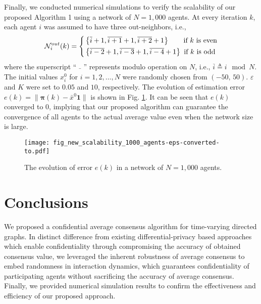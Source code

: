 \documentclass{IEEEtran}
\begin{document}
Finally, we conducted numerical simulations to verify the scalability of our proposed Algorithm 1 using a network of $N=1,000$ agents. At every iteration $k$, each agent $i$ was assumed to have three out-neighbors, i.e.,
\begin{equation}
	\mathcal{N}_i^{out}(k)=\left\{
	\begin{aligned}
		& \left\{\overline{i}+1,\overline{i+1}+1,\overline{i+2}+1\right\} \qquad \textnormal{if} \ k \ \textnormal{is even}\\
		& \left\{\overline{i-2}+1, \overline{i-3}+1,\overline{i-4}+1\right\} \ \textnormal{if} \ k \ \textnormal{is odd}\\
	\end{aligned}\right.
\end{equation}
where the superscript ``$\bar{\quad}$'' represents modulo operation on $N$, i.e., $\overline{i} \triangleq i \mod N$. The initial values $x_i^0$ for $i=1,2,\ldots,N$ were randomly chosen from $(-50,\, 50)$. $\varepsilon$ and $K$ were set to $0.05$ and $10$, respectively. The evolution of estimation error $e(k)=\|\boldsymbol{\pi}(k)-\bar{x}^0 \mathbf{1}\|$ is shown in Fig. \ref{fig_evolution_1000_agents}. It can be seen that $e(k)$ converged to $0$, implying that our proposed algorithm can guarantee the convergence of all agents to the actual average value even when the network size is large.

\begin{figure}[!h]
	\begin{center}
		\texttt{[image: fig\_new\_scalability\_1000\_agents-eps-converted-to.pdf]}
	\end{center}
	\caption{The evolution of error $e(k)$ in a network of $N=1,000$ agents.}
	\label{fig_evolution_1000_agents}
\end{figure}


\section{Conclusions}

We proposed a confidential average consensus algorithm for time-varying directed graphs. In distinct difference from existing differential-privacy based approaches which enable confidentiality through compromising the accuracy of obtained consensus value, we leveraged the inherent robustness of average consensus to embed randomness in interaction dynamics, which guarantees confidentiality of participating agents without sacrificing the accuracy of average consensus. Finally, we provided numerical simulation results to confirm the effectiveness and efficiency of our proposed approach.
\end{document}
